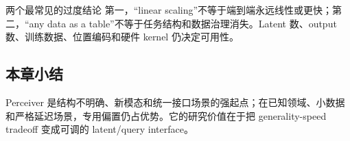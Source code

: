 \begin{warningbox}{两个最常见的过度结论}
第一，“linear scaling”不等于端到端永远线性或更快；第二，“any data as a table”不等于任务结构和数据治理消失。Latent 数、output 数、训练数据、位置编码和硬件 kernel 仍决定可用性。
\end{warningbox}

\subsection{本章小结}

Perceiver 是结构不明确、新模态和统一接口场景的强起点；在已知领域、小数据和严格延迟场景，专用偏置仍占优势。它的研究价值在于把 generality-speed tradeoff 变成可调的 latent/query interface。

